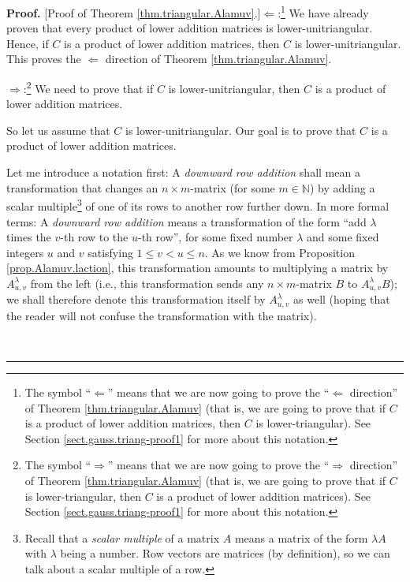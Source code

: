 \documentclass[numbers=enddot,12pt,final,onecolumn,notitlepage]{scrartcl}%
\theoremstyle{definition}
\newenvironment{proof}[1][Proof]{\noindent\textbf{#1.} }{\ \rule{0.5em}{0.5em}}
\begin{document}
\begin{proof}
[Proof of Theorem \ref{thm.triangular.Alamuv}.]$\Longleftarrow$:\footnote{The
symbol ``$\Longleftarrow$'' means that we are now going to prove the
``$\Longleftarrow$ direction'' of Theorem \ref{thm.triangular.Alamuv} (that
is, we are going to prove that if $C$ is a product of lower addition matrices,
then $C$ is lower-triangular). See Section \ref{sect.gauss.triang-proof1} for
more about this notation.} We have already proven that every product of lower
addition matrices is lower-unitriangular. Hence, if $C$ is a product of lower
addition matrices, then $C$ is lower-unitriangular. This proves the
$\Longleftarrow$ direction of Theorem \ref{thm.triangular.Alamuv}.

$\Longrightarrow$:\footnote{The symbol ``$\Longrightarrow$'' means that we are
now going to prove the ``$\Longrightarrow$ direction'' of Theorem
\ref{thm.triangular.Alamuv} (that is, we are going to prove that if $C$ is
lower-triangular, then $C$ is a product of lower addition matrices). See
Section \ref{sect.gauss.triang-proof1} for more about this notation.} We need
to prove that if $C$ is lower-unitriangular, then $C$ is a product of lower
addition matrices.

So let us assume that $C$ is lower-unitriangular. Our goal is to prove that
$C$ is a product of lower addition matrices.

Let me introduce a notation first: A \textit{downward row addition} shall mean
a transformation that changes an $n\times m$-matrix (for some $m \in
\mathbb{N}$) by adding a scalar multiple\footnote{Recall that a \textit{scalar
multiple} of a matrix $A$ means a matrix of the form $\lambda A$ with
$\lambda$ being a number. Row vectors are matrices (by definition), so we can
talk about a scalar multiple of a row.} of one of its rows to another row
further down. In more formal terms: A \textit{downward row addition} means a
transformation of the form ``add $\lambda$ times the $v$-th row to the $u$-th
row'', for some fixed number $\lambda$ and some fixed integers $u$ and $v$
satisfying $1 \leq v < u \leq n$. As we know from Proposition
\ref{prop.Alamuv.laction}, this transformation amounts to multiplying a matrix
by $A^{\lambda}_{u, v}$ from the left (i.e., this transformation sends any
$n\times m$-matrix $B$ to $A^{\lambda}_{u,v} B$); we shall therefore denote
this transformation itself by $A^{\lambda}_{u,v}$ as well (hoping that the
reader will not confuse the transformation with the matrix).


\end{proof}
\end{document}
